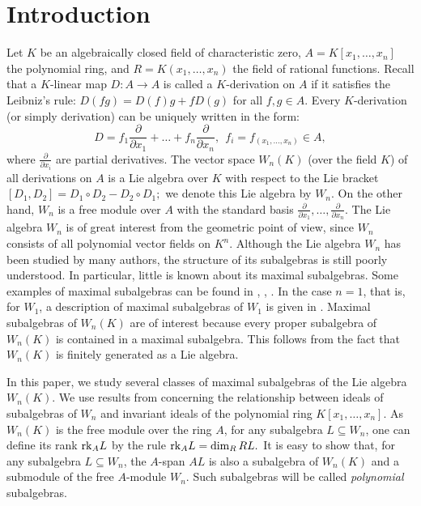 \documentclass[12pt,a4paper]{amsart}
\theoremstyle{plain}
\theoremstyle{definition}
\begin{document}
	\section{Introduction}
Let $K$ be an algebraically closed field of characteristic zero, $A = K[x_1, \dots, x_n]$ the polynomial ring, and $R = K(x_1, \dots, x_n)$ the field of rational functions.
Recall that a $K$-linear map $D: A \rightarrow A$ is called a $K$-derivation on $A$ if it satisfies the Leibniz's rule:	$D(fg) = D(f)g + fD(g)$  for all $ f, g \in A.$
Every $K$-derivation (or simply derivation) can be uniquely written in the form:
$$	D = f_1 \frac{\partial}{\partial x_1} + \dots + f_n \frac{\partial}{\partial x_n}, \ \ 
f_i=f_(x_1, \ldots , x_n) \in A,$$ where $\frac{\partial}{\partial x_i}$ are partial derivatives.
The vector space  $W_n(K)$ (over the field $K$) of all derivations on $A$ is a Lie algebra over $K$ with respect to the Lie bracket $	[D_1, D_2] = D_1 \circ D_2 - D_2 \circ D_1;$  we denote this Lie algebra  by $W_n.$ 
On the other hand,  $W_n$ is a free module over $A$ with the standard basis $\frac{\partial}{\partial x_1}, \dots, \frac{\partial}{\partial x_n}$. The Lie algebra $W_n$ is of great interest from the  geometric point of view, since  $W_n$ consists of all polynomial vector fields on $K^n$.
Although the Lie algebra $W_n$ has been  studied by many authors, the structure of its subalgebras is still  poorly understood. In particular,  little is known about its maximal subalgebras. Some examples of maximal subalgebras can be found in \cite{Rud1}, \cite{Bavula}, \cite{ESS}. In the case $n=1$, that is, for $W_1$,  a description of maximal subalgebras of $W_1$  is given  in \cite{Bell}.
Maximal subalgebras of $W_n(K)$ are of interest because every proper subalgebra of $W_n(K)$ is contained in a maximal subalgebra.  This follows from the fact  that $W_n(K)$ is finitely generated as a Lie algebra. 	 

In this paper, we study several classes of maximal subalgebras of the Lie algebra $W_n(K)$. We use  results from  \cite{J1} concerning the relationship  between ideals of subalgebras of $W_n$ and invariant ideals of the polynomial ring $K[x_1, \dots, x_n].$ 
As $W_n(K)$ is the free module over the ring $A$, for any subalgebra $L \subseteq W_n$, one can define its rank   ${\rm rk}_A L$ by the rule
${\rm rk}_A L = \dim_{R} RL.$ It is easy to show that, for any subalgebra $L \subseteq W_n$, the $A$-span  $AL$ is also a subalgebra of $W_n(K)$ and a submodule of the free $A$-module $W_n.$ Such subalgebras will be called \textit{polynomial} subalgebras.
\end{document}
